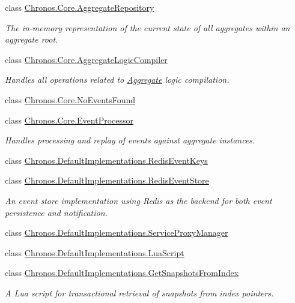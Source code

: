 \begin{DoxyCompactItemize}
class \hyperlink{classChronos_1_1Core_1_1AggregateRepository}{Chronos.\+Core.\+Aggregate\+Repository}
\begin{DoxyCompactList}\small\item\em The in-\/memory representation of the current state of all aggregates within an aggregate root. \end{DoxyCompactList}\item 
class \hyperlink{classChronos_1_1Core_1_1AggregateLogicCompiler}{Chronos.\+Core.\+Aggregate\+Logic\+Compiler}
\begin{DoxyCompactList}\small\item\em Handles all operations related to \hyperlink{classChronos_1_1Core_1_1Aggregate}{Aggregate} logic compilation. \end{DoxyCompactList}\item 
class \hyperlink{classChronos_1_1Core_1_1NoEventsFound}{Chronos.\+Core.\+No\+Events\+Found}
\item 
class \hyperlink{classChronos_1_1Core_1_1EventProcessor}{Chronos.\+Core.\+Event\+Processor}
\begin{DoxyCompactList}\small\item\em Handles processing and replay of events against aggregate instances. \end{DoxyCompactList}\item 
class \hyperlink{classChronos_1_1DefaultImplementations_1_1RedisEventKeys}{Chronos.\+Default\+Implementations.\+Redis\+Event\+Keys}
\item 
class \hyperlink{classChronos_1_1DefaultImplementations_1_1RedisEventStore}{Chronos.\+Default\+Implementations.\+Redis\+Event\+Store}
\begin{DoxyCompactList}\small\item\em An event store implementation using Redis as the backend for both event persistence and notification. \end{DoxyCompactList}\item 
class \hyperlink{classChronos_1_1DefaultImplementations_1_1ServiceProxyManager}{Chronos.\+Default\+Implementations.\+Service\+Proxy\+Manager}
\item 
class \hyperlink{classChronos_1_1DefaultImplementations_1_1LuaScript}{Chronos.\+Default\+Implementations.\+Lua\+Script}
\item 
class \hyperlink{classChronos_1_1DefaultImplementations_1_1GetSnapshotsFromIndex}{Chronos.\+Default\+Implementations.\+Get\+Snapshots\+From\+Index}
\begin{DoxyCompactList}\small\item\em A Lua script for transactional retrieval of snapshots from index pointers. \end{DoxyCompactList}\item 

\end{DoxyCompactItemize}
